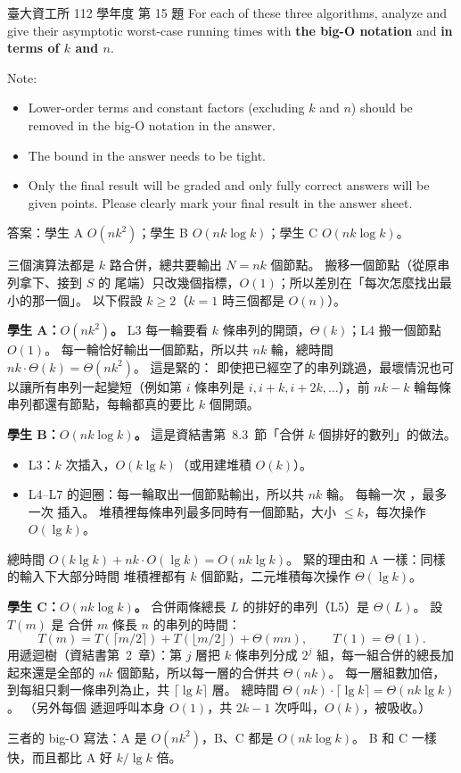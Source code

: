 \begin{pastexam}[label={px:ntu-112-dsa-15}]{臺大資工所 112 學年度 第 15 題}
\medskip
For each of these three algorithms, analyze and give their asymptotic worst-case running times with
\textbf{the big-O notation} and \textbf{in terms of $k$ and $n$}.

Note:
\begin{itemize}
\item Lower-order terms and constant factors (excluding $k$ and $n$) should be removed in the big-O
notation in the answer.
\item The bound in the answer needs to be tight.
\item Only the final result will be graded and only fully correct answers will be given points.
Please clearly mark your final result in the answer sheet.
\end{itemize}
\end{pastexam}

\begin{pastsoln}
答案：學生 A $O(nk^2)$；學生 B $O(nk \log k)$；學生 C $O(nk \log k)$。

三個演算法都是 $k$ 路合併，總共要輸出 $N = nk$ 個節點。 搬移一個節點（從原串列拿下、接到 $S$ 的
尾端）只改幾個指標，$O(1)$；所以差別在「每次怎麼找出最小的那一個」。 以下假設 $k \ge 2$（$k = 1$
時三個都是 $O(n)$）。

\textbf{學生 A：$O(nk^2)$。} L3 每一輪要看 $k$ 條串列的開頭，$\Theta(k)$；L4 搬一個節點 $O(1)$。
每一輪恰好輸出一個節點，所以共 $nk$ 輪，總時間 $nk \cdot \Theta(k) = \Theta(nk^2)$。 這是緊的：
即使把已經空了的串列跳過，最壞情況也可以讓所有串列一起變短（例如第 $i$ 條串列是
$i, i + k, i + 2k, \ldots$），前 $nk - k$ 輪每條串列都還有節點，每輪都真的要比 $k$ 個開頭。

\textbf{學生 B：$O(nk \log k)$。} 這是資結書第~8.3~節「合併 $k$ 個排好的數列」的做法。
\begin{itemize}
\item L3：$k$ 次插入，$O(k \lg k)$（或用建堆積 $O(k)$）。
\item L4--L7 的迴圈：每一輪取出一個節點輸出，所以共 $nk$ 輪。 每輪一次 ，最多一次
插入。 堆積裡每條串列最多同時有一個節點，大小 $\le k$，每次操作 $O(\lg k)$。
\end{itemize}
總時間 $O(k \lg k) + nk \cdot O(\lg k) = O(nk \lg k)$。 緊的理由和 A 一樣：同樣的輸入下大部分時間
堆積裡都有 $k$ 個節點，二元堆積每次操作 $\Theta(\lg k)$。

\textbf{學生 C：$O(nk \log k)$。} 合併兩條總長 $L$ 的排好的串列（L5）是 $\Theta(L)$。 設 $T(m)$ 是
合併 $m$ 條長 $n$ 的串列的時間：
\[
T(m) = T(\lceil m/2 \rceil) + T(\lfloor m/2 \rfloor) + \Theta(mn), \qquad T(1) = \Theta(1).
\]
用遞迴樹（資結書第~2~章）：第 $j$ 層把 $k$ 條串列分成 $2^j$ 組，每一組合併的總長加起來還是全部的
$nk$ 個節點，所以每一層的合併共 $\Theta(nk)$。 每一層組數加倍，到每組只剩一條串列為止，共
$\lceil \lg k \rceil$ 層。 總時間 $\Theta(nk) \cdot \lceil \lg k \rceil = \Theta(nk \lg k)$。 （另外每個
遞迴呼叫本身 $O(1)$，共 $2k - 1$ 次呼叫，$O(k)$，被吸收。）

三者的 big-O 寫法：A 是 $O(nk^2)$，B、C 都是 $O(nk \log k)$。 B 和 C 一樣快，而且都比 A 好
$k / \lg k$ 倍。
\end{pastsoln}
